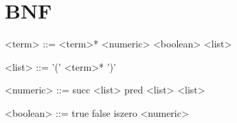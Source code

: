\documentclass[]{article}
\date{May 05, 2017}
\begin{document}
  \section{BNF}
  \setlength{\grammarparsep}{20pt}
  \setlength{\grammarindent}{8em}
  \begin{grammar}
    <term>     ::= <term>*
              \alt <numeric> 
              \alt <boolean>
              \alt <list>

    <list>     ::= '(' <term>* ')'
    
    <numeric>  ::= succ <list> 
              \alt pred <list> 
              \alt <list>
    
    <boolean>  ::= true 
              \alt false 
              \alt iszero <numeric>
  \end{grammar}
\end{document}
